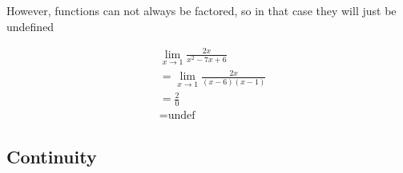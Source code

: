 \documentclass[12pt]{article}
\begin{document}
        However, functions can not always be factored, so in that case they will just be undefined

        \[
            \begin{aligned}
                & \lim_{x \to 1} \frac{2x}{x^2 - 7x + 6} \\
                &= \lim_{x \to 1} \frac{2x}{(x -6)(x -1)} \\
                &= \frac{2}{0} \\
                &= \text{undef}
            \end{aligned}    
        \]

        \subsection{Continuity}

        
\end{document}
